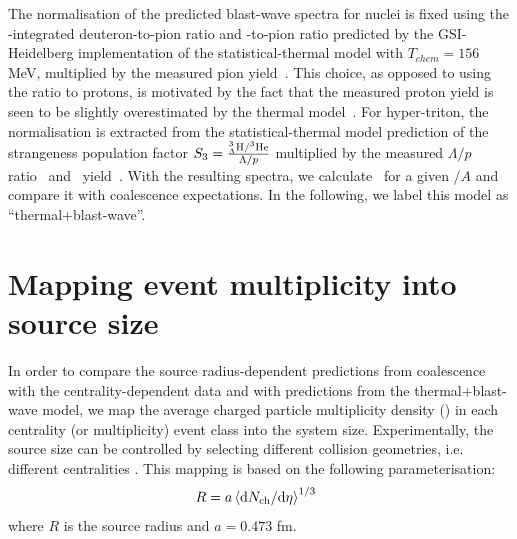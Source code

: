 \documentclass[%
 reprint,
 amsmath,amssymb,
 aps,
]{revtex4-1}
\begin{document}
The normalisation of the predicted blast-wave spectra for nuclei is fixed using the \pt-integrated deuteron-to-pion ratio and \hethree-to-pion ratio predicted by the GSI-Heidelberg implementation of the statistical-thermal model with $T_{chem} = 156$ MeV, multiplied by the measured pion yield~\cite{Abelev:2013vea}. 
This choice, as opposed to using the ratio to protons, is motivated by the fact that the measured proton yield is seen to be slightly overestimated by the thermal model~\cite{Abelev:2012wca}.
For hyper-triton, the normalisation is extracted from the statistical-thermal model prediction of the strangeness population factor \mbox{$S_{3} = { _{\Lambda}^{3}\mathrm{H} / ^{3}{\mathrm{He}} \over \Lambda/p}$} multiplied by the measured $\Lambda/p$ ratio~\cite{Abelev:2013vea,Abelev:2013xaa} and \hethree~yield~\cite{ALICE:deuteronppPbPb2015}. 
With the resulting spectra, we calculate \bA~for a given \pt/$A$ and compare it with coalescence expectations. 
In the following, we label this model as ``thermal+blast-wave''.

\section{Mapping event multiplicity into source size} \label{sec:radiiParamet}
In order to compare the source radius-dependent predictions from coalescence with the centrality-dependent data and with predictions from the thermal+blast-wave model, we map the average charged particle multiplicity density (\avdNdeta) in each centrality (or multiplicity) event class into the system size. 
Experimentally, the source size can be controlled by selecting different collision geometries, i.e. different centralities \cite{Abelev:2013qoq}. 
This mapping is based on the following parameterisation:
%
\begin{equation}
R = a \left<\mathrm{d}N_\mathrm{ch}/\mathrm{d}\eta\right>^{1/3}\;\;
\label{eq:radiusParameterisation}
\end{equation}
%
\noindent where $R$ is the source radius and $a = 0.473$ fm. 
\end{document}
